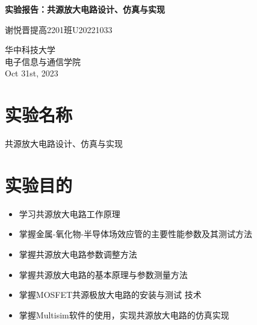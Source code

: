 \documentclass[a4paper,11pt,UTF8]{article}
\numberwithin{equation}{subsection}
\begin{document}
\begin{titlepage}
	\begin{center}
		\vspace*{1cm}
		\textbf{\LARGE 实验报告：共源放大电路设计、仿真与实现}
		\vspace{0.5cm}
		
		\Large 谢悦晋\quad 提高2201班\quad U20221033
		\vspace{1cm}
		\begin{figure}[H]
			\centering
			\caption*{}
		\end{figure}
		\vfill
		\vspace{0.8cm}
		华中科技大学 \\
		电子信息与通信学院 \\
		Oct 31st, 2023
	\end{center}
\end{titlepage}
\tableofcontents\newpage
\section{实验名称}
共源放大电路设计、仿真与实现
\section{实验目的}
\begin{itemize}
	\item 学习共源放大电路工作原理
	\item 掌握金属-氧化物-半导体场效应管的主要性能参数及其测试方法
	\item 掌握共源放大电路参数调整方法
	\item 掌握共源放大电路的基本原理与参数测量方法
	\item 掌握MOSFET共源极放大电路的安装与测试 技术
	\item 掌握Multisim软件的使用，实现共源放大电路的仿真实现
\end{itemize}
\end{document}
